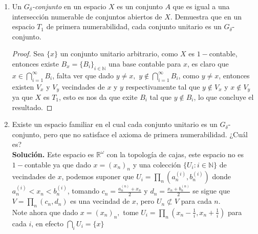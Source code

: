 \item 
    \begin{enumerate}
        \item Un \textit{$G_{\delta}$-conjunto} en un espacio $X$ es un conjunto $A$ que es igual a una intersección numerable de conjuntos abiertos de $X$. Demuestra que en un espacio $T_1$ de primera numerabilidad, cada conjunto unitario es un $G_{\delta}$-conjunto.
        \begin{proof}
        Sea $\{x\}$ un conjunto unitario arbitrario, como $X$ es $1-$contable, entonces existe $B_x=\{B_i\}_{i\in \mathbb{N}}$ una base contable para  $x$, es claro que $x\in \bigcap_{i=1}^{\infty}B_i$, falta ver que dado $y\neq x,$ $y\not\in \bigcap_{i=1}^{\infty}B_i$, como $y\neq x$, entonces existen $V_x$ y $V_y$ vecindades de $x$ y  $y$ respectivamente tal que $y\not\in V_x$ y $x\not\in V_y$ ya que $X$ es $T_1$, esto es nos da que exite $B_i$ tal que $y\notin B_i$, lo que concluye el resultado.
        \end{proof}
        \item Existe un espacio familiar en el cual cada conjunto unitario es un $G_{\delta}$-conjunto, pero que no satisface el axioma de primera numerabilidad. ¿Cuál es?\\

        \textbf{Solución.} Este espacio es $\mathbb{R}^{\omega}$ con la topología de cajas, este espacio no es $1-$contable ya que dado $x=(x_n)_n$  y una colección $\{U_i:i\in \mathbb{N}\}$ de vecindades de $x$, podemos suponer que $U_i=\prod_n(a_n^{(i)},b_n^{(i)})$ donde $a_n^{(i)}<x_n<b_n^{(i)}$, tomando $c_n=\frac{a_n^{(n)}+x_n}{2}$ y $d_n=\frac{x_n+b_n^{(n)}}{2}$ se sigue que $V=\prod_n(c_n,d_n)$ es una vecindad de $x$, pero $U_n\not\subset V$ para cada $n$.\\

        Note ahora que dado $x=(x_n)_n,$ tome $U_i=\prod_n\left(x_n-\frac{1}{i},x_n+\frac{1}{i}\right)$ para cada $i$, en efecto $\bigcap_{i} U_i=\{x\}
            $
    \end{enumerate}
